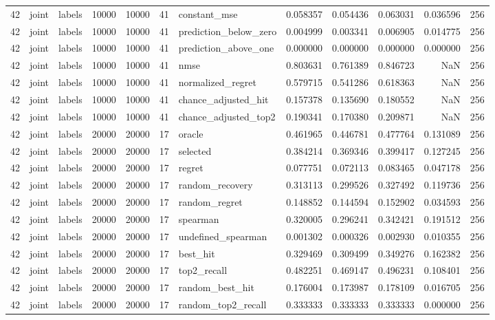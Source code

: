 \begin{tabular}{rllrrrlrrrrr}
42 & joint & labels & 10000 & 10000 & 41 & constant_mse & 0.058357 & 0.054436 & 0.063031 & 0.036596 & 256 \\
42 & joint & labels & 10000 & 10000 & 41 & prediction_below_zero & 0.004999 & 0.003341 & 0.006905 & 0.014775 & 256 \\
42 & joint & labels & 10000 & 10000 & 41 & prediction_above_one & 0.000000 & 0.000000 & 0.000000 & 0.000000 & 256 \\
42 & joint & labels & 10000 & 10000 & 41 & nmse & 0.803631 & 0.761389 & 0.846723 & NaN & 256 \\
42 & joint & labels & 10000 & 10000 & 41 & normalized_regret & 0.579715 & 0.541286 & 0.618363 & NaN & 256 \\
42 & joint & labels & 10000 & 10000 & 41 & chance_adjusted_hit & 0.157378 & 0.135690 & 0.180552 & NaN & 256 \\
42 & joint & labels & 10000 & 10000 & 41 & chance_adjusted_top2 & 0.190341 & 0.170380 & 0.209871 & NaN & 256 \\
42 & joint & labels & 20000 & 20000 & 17 & oracle & 0.461965 & 0.446781 & 0.477764 & 0.131089 & 256 \\
42 & joint & labels & 20000 & 20000 & 17 & selected & 0.384214 & 0.369346 & 0.399417 & 0.127245 & 256 \\
42 & joint & labels & 20000 & 20000 & 17 & regret & 0.077751 & 0.072113 & 0.083465 & 0.047178 & 256 \\
42 & joint & labels & 20000 & 20000 & 17 & random_recovery & 0.313113 & 0.299526 & 0.327492 & 0.119736 & 256 \\
42 & joint & labels & 20000 & 20000 & 17 & random_regret & 0.148852 & 0.144594 & 0.152902 & 0.034593 & 256 \\
42 & joint & labels & 20000 & 20000 & 17 & spearman & 0.320005 & 0.296241 & 0.342421 & 0.191512 & 256 \\
42 & joint & labels & 20000 & 20000 & 17 & undefined_spearman & 0.001302 & 0.000326 & 0.002930 & 0.010355 & 256 \\
42 & joint & labels & 20000 & 20000 & 17 & best_hit & 0.329469 & 0.309499 & 0.349276 & 0.162382 & 256 \\
42 & joint & labels & 20000 & 20000 & 17 & top2_recall & 0.482251 & 0.469147 & 0.496231 & 0.108401 & 256 \\
42 & joint & labels & 20000 & 20000 & 17 & random_best_hit & 0.176004 & 0.173987 & 0.178109 & 0.016705 & 256 \\
42 & joint & labels & 20000 & 20000 & 17 & random_top2_recall & 0.333333 & 0.333333 & 0.333333 & 0.000000 & 256 \\

\end{tabular}
